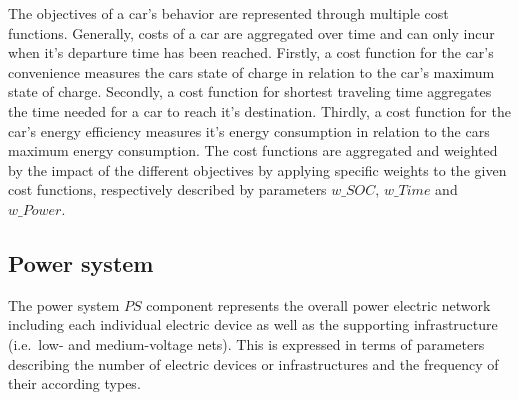 The objectives of a car's behavior are represented through multiple cost functions. Generally, costs of a car are aggregated over time and can only incur when it's departure time has been reached. Firstly, a cost function for the car's convenience measures the cars state of charge in relation to the car's maximum state of charge. Secondly, a cost function for shortest traveling time aggregates the time needed for a car to reach it's destination. Thirdly, a cost function for the car's energy efficiency measures it's energy consumption in relation to the cars maximum energy consumption. The cost functions are aggregated and weighted by the impact of the different objectives by applying specific weights to the given cost functions, respectively described by parameters $w\_SOC$, $w\_Time$ and $w\_Power$.

\subsection{Power system}

The power system $PS$ component represents the overall power electric network including each individual electric device as well as the supporting infrastructure (i.e.\ low- and medium-voltage nets).
This is expressed in terms of parameters describing the number of electric devices or infrastructures and the frequency of their according types.

